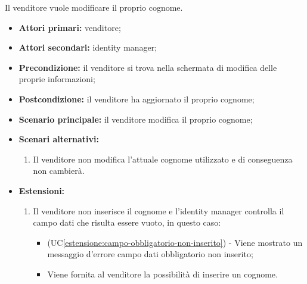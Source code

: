 Il venditore vuole modificare il proprio cognome.
\begin{itemize}
	\item \textbf{Attori primari:} venditore;
	\item \textbf{Attori secondari:} identity manager;
	\item \textbf{Precondizione:} il venditore si trova nella schermata di modifica delle proprie informazioni;
	\item \textbf{Postcondizione:} il venditore ha aggiornato il proprio cognome;
	\item \textbf{Scenario principale:} il venditore modifica il proprio cognome;
	\item \textbf{Scenari alternativi:}
	\begin{enumerate}[label=\lett]
		\item Il venditore non modifica l'attuale cognome utilizzato e di conseguenza non cambierà.
	\end{enumerate}
	\item \textbf{Estensioni:}
	\begin{enumerate}[label=\lett]
		\item Il venditore non inserisce il cognome e l'identity manager controlla il campo dati che risulta essere vuoto, in questo caso:
		\begin{itemize}
			\item (UC\ref{estensione:campo-obbligatorio-non-inserito}) - Viene mostrato un messaggio d'errore campo dati obbligatorio non inserito;
			\item Viene fornita al venditore la possibilità di inserire un cognome.
		\end{itemize}
	\end{enumerate} 
\end{itemize}

\label{modifica-informazioni-venditore.email}

